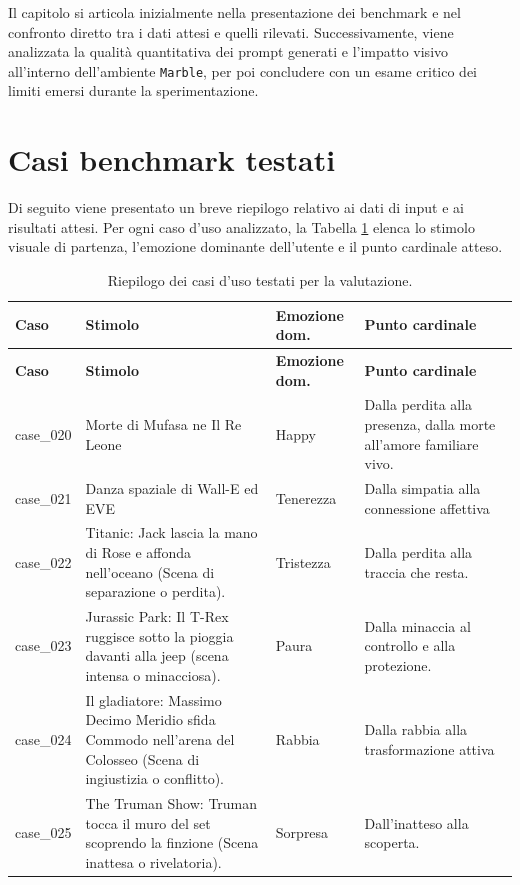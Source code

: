 \documentclass[11pt]{report}
\begin{document}
Il capitolo si articola inizialmente nella presentazione dei benchmark e nel confronto diretto tra i dati attesi e quelli rilevati. Successivamente, viene analizzata la qualità quantitativa dei prompt generati e l'impatto visivo all'interno dell'ambiente \texttt{Marble}, per poi concludere con un esame critico dei limiti emersi durante la sperimentazione.
 
\section{Casi benchmark testati}
Di seguito viene presentato un breve riepilogo relativo ai dati di input e ai risultati attesi. Per ogni caso d'uso analizzato, la Tabella \ref{tab:benchmark} elenca lo stimolo visuale di partenza, l'emozione dominante dell'utente e il punto cardinale atteso.
 
\begin{longtable}{p{}p{}p{}p{}}
    \caption{Riepilogo dei casi d'uso testati per la valutazione.}
    \label{tab:benchmark} \\
    \toprule
    \textbf{Caso} & \textbf{Stimolo} & \textbf{Emozione dom.} & \textbf{Punto cardinale} \\
    \midrule
    \endfirsthead
    \toprule
    \textbf{Caso} & \textbf{Stimolo} & \textbf{Emozione dom.} & \textbf{Punto cardinale} \\
    \midrule
    \endhead
    case\_020 & Morte di Mufasa ne Il Re Leone & Happy & Dalla perdita alla presenza, dalla morte all'amore familiare vivo. \\
    case\_021 & Danza spaziale di Wall-E ed EVE & Tenerezza & Dalla simpatia alla connessione affettiva \\
    case\_022 & Titanic: Jack lascia la mano di Rose e affonda nell'oceano (Scena di separazione o perdita). & Tristezza & Dalla perdita alla traccia che resta. \\
    case\_023 & Jurassic Park: Il T-Rex ruggisce sotto la pioggia davanti alla jeep (scena intensa o minacciosa). & Paura & Dalla minaccia al controllo e alla protezione. \\
    case\_024 & Il gladiatore: Massimo Decimo Meridio sfida Commodo nell'arena del Colosseo (Scena di ingiustizia o conflitto). & Rabbia & Dalla rabbia alla trasformazione attiva \\
    case\_025 & The Truman Show: Truman tocca il muro del set scoprendo la finzione (Scena inattesa o rivelatoria). & Sorpresa & Dall'inatteso alla scoperta. \\
    \bottomrule
\end{longtable}
\end{document}
